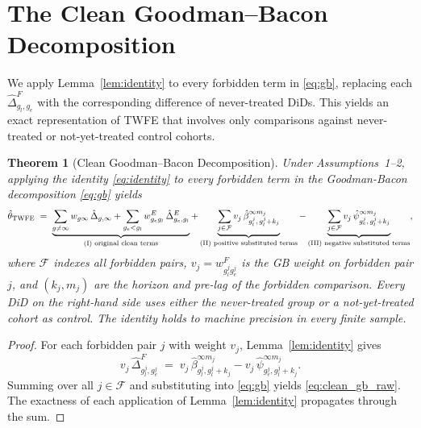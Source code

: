 \documentclass[12pt,letterpaper]{article}
\newtheorem{theorem}{Theorem}[section]
\theoremstyle{remark}
\theoremstyle{definition}
\newcommand{\TWFE}{\hat{\theta}_{\mathrm{TWFE}}}
\newcommand{\hbeta}{\hat{\beta}}
\newcommand{\hpsi}{\hat{\psi}}     %
\newcommand{\hDelta}{\hat{\Delta}}
\begin{document}
\section{The Clean Goodman--Bacon Decomposition}
\label{sec:clean_gb}

We apply Lemma~\ref{lem:identity} to every forbidden term in \eqref{eq:gb},
replacing each $\hDelta_{g_l,g_e}^{F}$ with the corresponding difference of
never-treated DiDs. This yields an exact representation of TWFE that involves
only comparisons against never-treated or not-yet-treated control cohorts.

\begin{theorem}[Clean Goodman--Bacon Decomposition]
  \label{thm:clean_gb}
  Under Assumptions~1--2, applying the identity \eqref{eq:identity} to every
  forbidden term in the Goodman-Bacon decomposition \eqref{eq:gb} yields
  \begin{equation}
    \TWFE
    \;=\;
    \underbrace{%
      \sum_{g\neq\infty}w_{g\infty}\,\hDelta_{g,\infty}
      +\sum_{g_e<g_l}w_{g_e g_l}^{E}\,\hDelta_{g_e,g_l}^{E}
    }_{\text{(I) original clean terms}}
    +
    \underbrace{%
      \sum_{j\in\mathcal{F}}v_j\,\hbeta^{\infty m_j}_{g_l^j,\,g_l^j+k_j}
    }_{\text{(II) positive substituted terms}}
    -
    \underbrace{%
      \sum_{j\in\mathcal{F}}v_j\,\hpsi^{\infty m_j}_{g_e^j,\,g_l^j+k_j}
    }_{\text{(III) negative substituted terms}},
    \label{eq:clean_gb_raw}
  \end{equation}
  where $\mathcal{F}$ indexes all forbidden pairs, $v_j = w_{g_l^j g_e^j}^F$
  is the GB weight on forbidden pair $j$, and $(k_j, m_j)$ are the horizon
  and pre-lag of the forbidden comparison. Every DiD on the right-hand side
  uses either the never-treated group or a not-yet-treated cohort as control.
  The identity holds to machine precision in every finite sample.
\end{theorem}

\begin{proof}
  For each forbidden pair $j$ with weight $v_j$, Lemma~\ref{lem:identity}
  gives
  \[
    v_j\,\hDelta_{g_l^j,g_e^j}^{F}
    \;=\;
    v_j\,\hbeta^{\infty m_j}_{g_l^j,g_l^j+k_j}
    -v_j\,\hpsi^{\infty m_j}_{g_e^j,g_l^j+k_j}.
  \]
  Summing over all $j\in\mathcal{F}$ and substituting into \eqref{eq:gb}
  yields \eqref{eq:clean_gb_raw}. The exactness of each application of
  Lemma~\ref{lem:identity} propagates through the sum.
\end{proof}
\end{document}
